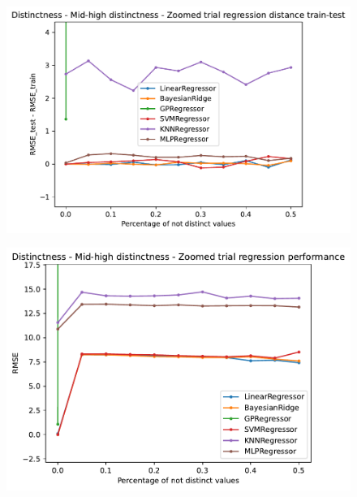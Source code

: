 \documentclass{Configuration_Files/PoliMi3i_thesis}
\begin{document}
\begin{figure}
    \centering
    \includegraphics[scale=0.6]{Images/distinctness/dex1/Distinctness - Mid-high distinctness - Zoomed trial regression distance train-test.pdf}
\end{figure}
\begin{figure}
    \centering
    \includegraphics[scale=0.6]{Images/distinctness/dex1/Distinctness - Mid-high distinctness - Zoomed trial regression performance.pdf}
\end{figure}
\end{document}
